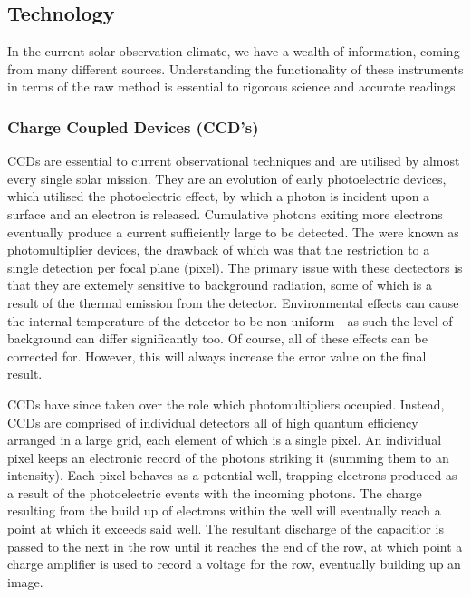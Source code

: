 \subsection{Technology}

In the current solar observation climate, we have a wealth of information, coming from many different sources.
Understanding the functionality of these instruments in terms of the raw method is essential to rigorous science and accurate readings.

\subsubsection{Charge Coupled Devices (CCD's)}

CCDs are essential to current observational techniques and are utilised by almost every single solar mission.
They are an evolution of early photoelectric devices, which utilised the photoelectric effect, by which a photon is incident upon a surface and an electron is released.
Cumulative photons exiting more electrons eventually produce a current sufficiently large to be detected.
The were known as photomultiplier devices, the drawback of which was that the restriction to a single detection per focal plane (pixel).
The primary issue with these dectectors is that they are extemely sensitive to background radiation, some of which is a result of the thermal emission from the detector.
Environmental effects can cause the internal temperature of the detector to be non uniform - as such the level of background can differ significantly too.
Of course, all of these effects can be corrected for.
However, this will always increase the error value on the final result.

CCDs have since taken over the role which photomultipliers occupied.
Instead, CCDs are comprised of individual detectors all of high quantum efficiency arranged in a large grid, each element of which is a single pixel.
An individual pixel keeps an electronic record of the photons striking it (summing them to an intensity).
Each pixel behaves as a potential well, trapping electrons produced as a result of the photoelectric events with the incoming photons.
The charge resulting from the build up of electrons within the well will eventually reach a point at which it exceeds said well.
The resultant discharge of the capacitior is passed to the next in the row until it reaches the end of the row, at which point a charge amplifier is used to record a voltage for the row, eventually building up an image.

